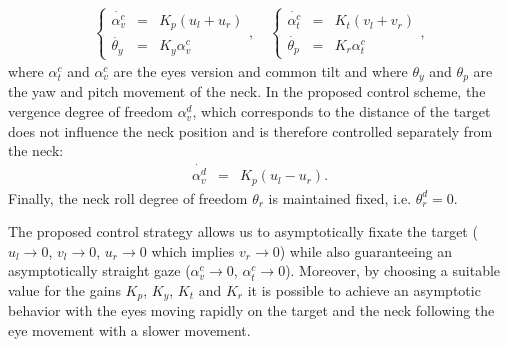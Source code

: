 \begin{eqnarray} \label{Eq:HeadEyeControl}
\left\{\begin{matrix}
\dot {\alpha_v^c} &=&   K_p (u_l + u_r)\\
\dot {\theta_y} &=&   K_y \alpha_v^c 
\end{matrix}
\right.,\quad
\left\{ \begin{matrix}
\dot {\alpha_t^c} &=&   K_t (v_l + v_r)\\
\dot {\theta_p} &=&   K_r \alpha_t^c
\end{matrix} \right.,
\end{eqnarray}
%
where $\alpha_t^c$ and $\alpha_v^c$ are the eyes version and common tilt and 
where $\theta_y$ and $\theta_p$ are the yaw and pitch movement of the neck. 
In the proposed control scheme, the vergence degree of freedom $\alpha_v^d$, 
which corresponds to the distance of the target does not influence 
the neck position and is therefore controlled separately from the neck:
\begin{eqnarray} 
\dot {\alpha_v^d} &=&   K_p (u_l - u_r).
\end{eqnarray}
Finally, the neck roll degree of freedom $\theta_r$ is maintained fixed, 
i.e. $\theta_r^d=0$.

The proposed control strategy allows us to asymptotically fixate the target 
($u_l \rightarrow 0$, $v_l \rightarrow 0$, $u_r \rightarrow 0$ which 
implies $v_r \rightarrow 0$) while also guaranteeing an asymptotically 
straight gaze ($\alpha_v^c \rightarrow 0$, $\alpha_t^c \rightarrow 0$). Moreover, 
by choosing a suitable value for the gains $K_p$, $K_y$, $K_t$ and $K_r$ it
is possible to achieve an asymptotic behavior with the eyes moving rapidly on 
the target and the neck following the eye movement with a slower 
movement.
